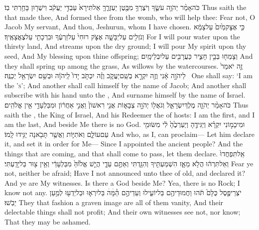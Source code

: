 {כֹּה\maqqaf אָמַ֨ר יְהֹוָ֥ה עֹשֶׂ֛ךָ וְיֹצֶרְךָ֥ מִבֶּ֖טֶן יַעְזְרֶ֑ךָּ אַל\maqqaf תִּירָא֙ עַבְדִּ֣י יַעֲקֹ֔ב וִישֻׁר֖וּן בָּחַ֥רְתִּי בֽוֹ׃}
{Thus saith the \lord\space that made thee, And formed thee from the womb, who will help thee: Fear not, O Jacob My servant, And thou, Jeshurun, whom I have chosen.}
{כִּ֤י אֶצׇּק\maqqaf מַ֙יִם֙ עַל\maqqaf צָמֵ֔א וְנֹזְלִ֖ים עַל\maqqaf יַבָּשָׁ֑ה אֶצֹּ֤ק רוּחִי֙ עַל\maqqaf זַרְעֶ֔ךָ וּבִרְכָתִ֖י עַל\maqqaf צֶאֱצָאֶֽיךָ׃}
{For I will pour water upon the thirsty land, And streams upon the dry ground; I will pour My spirit upon thy seed, And My blessing upon thine offspring;}
{וְצָמְח֖וּ בְּבֵ֣ין חָצִ֑יר כַּעֲרָבִ֖ים עַל\maqqaf יִבְלֵי\maqqaf מָֽיִם׃}
{And they shall spring up among the grass, As willows by the watercourses.}
{זֶ֤ה יֹאמַר֙ לַיהֹוָ֣ה אָ֔נִי וְזֶ֖ה יִקְרָ֣א בְשֵֽׁם\maqqaf יַעֲקֹ֑ב וְזֶ֗ה יִכְתֹּ֤ב יָדוֹ֙ לַֽיהֹוָ֔ה וּבְשֵׁ֥ם יִשְׂרָאֵ֖ל יְכַנֶּֽה׃ \petucha }
{One shall say: ‘I am the \lord\textsc{’s}’; And another shall call himself by the name of Jacob; And another shall subscribe with his hand unto the \lord, And surname himself by the name of Israel.}
{כֹּה\maqqaf אָמַ֨ר יְהֹוָ֧ה מֶלֶךְ\maqqaf יִשְׂרָאֵ֛ל וְגֹאֲל֖וֹ יְהֹוָ֣ה צְבָא֑וֹת אֲנִ֤י רִאשׁוֹן֙ וַאֲנִ֣י אַחֲר֔וֹן וּמִבַּלְעָדַ֖י אֵ֥ין אֱלֹהִֽים׃}
{Thus saith the \lord, the King of Israel, And his Redeemer the \lord\space of hosts: I am the first, and I am the last, And beside Me there is no God.}
{וּמִי\maqqaf כָמ֣וֹנִי יִקְרָ֗א וְיַגִּידֶ֤הָ וְיַעְרְכֶ֙הָ֙ לִ֔י מִשּׂוּמִ֖י עַם\maqqaf עוֹלָ֑ם וְאֹתִיּ֛וֹת וַאֲשֶׁ֥ר תָּבֹ֖אנָה יַגִּ֥ידוּ לָֽמוֹ׃}
{And who, as I, can proclaim— Let him declare it, and set it in order for Me— Since I appointed the ancient people? And the things that are coming, and that shall come to pass, let them declare.}
{אַֽל\maqqaf תִּפְחֲדוּ֙ וְאַל\maqqaf תִּרְה֔וּ הֲלֹ֥א מֵאָ֛ז הִשְׁמַעְתִּ֥יךָ וְהִגַּ֖דְתִּי וְאַתֶּ֣ם עֵדָ֑י הֲיֵ֤שׁ אֱל֙וֹהַּ֙ מִבַּלְעָדַ֔י וְאֵ֥ין צ֖וּר בַּל\maqqaf יָדָֽעְתִּי׃}
{Fear ye not, neither be afraid; Have I not announced unto thee of old, and declared it? And ye are My witnesses. Is there a God beside Me? Yea, there is no Rock; I know not any.}
{יֹצְרֵי\maqqaf פֶ֤סֶל כֻּלָּם֙ תֹּ֔הוּ וַחֲמוּדֵיהֶ֖ם בַּל\maqqaf יוֹעִ֑ילוּ וְעֵדֵיהֶ֣ם הֵ֗ׄמָּׄהׄ בַּל\maqqaf יִרְא֛וּ וּבַל\maqqaf יֵדְע֖וּ לְמַ֥עַן יֵבֹֽשׁוּ׃}
{They that fashion a graven image are all of them vanity, And their delectable things shall not profit; And their own witnesses see not, nor know; That they may be ashamed.}
